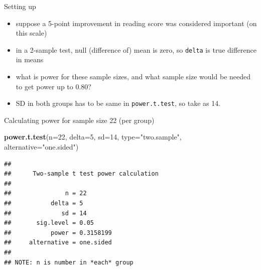 \documentclass[ignorenonframetext,]{beamer}
\newenvironment{Shaded}{\begin{snugshade}}{\end{snugshade}}
\newcommand{\DataTypeTok}[1]{\textcolor[rgb]{0.13,0.29,0.53}{#1}}
\newcommand{\DecValTok}[1]{\textcolor[rgb]{0.00,0.00,0.81}{#1}}
\newcommand{\KeywordTok}[1]{\textcolor[rgb]{0.13,0.29,0.53}{\textbf{#1}}}
\newcommand{\NormalTok}[1]{#1}
\newcommand{\StringTok}[1]{\textcolor[rgb]{0.31,0.60,0.02}{#1}}
\providecommand{\tightlist}{%
  \setlength{\itemsep}{0pt}\setlength{\parskip}{0pt}}
\begin{document}
\begin{frame}[fragile]{Setting up}
\protect\hypertarget{setting-up}{}

\begin{itemize}
\tightlist
\item
  suppose a 5-point improvement in reading score was considered
  important (on this scale)
\item
  in a 2-sample test, null (difference of) mean is zero, so
  \texttt{delta} is true difference in means
\item
  what is power for these sample sizes, and what sample size would be
  needed to get power up to 0.80?
\item
  SD in both groups has to be same in \texttt{power.t.test}, so take as
  14.
\end{itemize}

\end{frame}

\begin{frame}[fragile]{Calculating power for sample size 22 (per group)}
\protect\hypertarget{calculating-power-for-sample-size-22-per-group}{}

\begin{Shaded}
\begin{Highlighting}[]
\KeywordTok{power.t.test}\NormalTok{(}\DataTypeTok{n=}\DecValTok{22}\NormalTok{, }\DataTypeTok{delta=}\DecValTok{5}\NormalTok{, }\DataTypeTok{sd=}\DecValTok{14}\NormalTok{, }\DataTypeTok{type=}\StringTok{"two.sample"}\NormalTok{, }
             \DataTypeTok{alternative=}\StringTok{"one.sided"}\NormalTok{)}
\end{Highlighting}
\end{Shaded}

\begin{verbatim}
## 
##      Two-sample t test power calculation 
## 
##               n = 22
##           delta = 5
##              sd = 14
##       sig.level = 0.05
##           power = 0.3158199
##     alternative = one.sided
## 
## NOTE: n is number in *each* group
\end{verbatim}

\end{frame}
\end{document}
